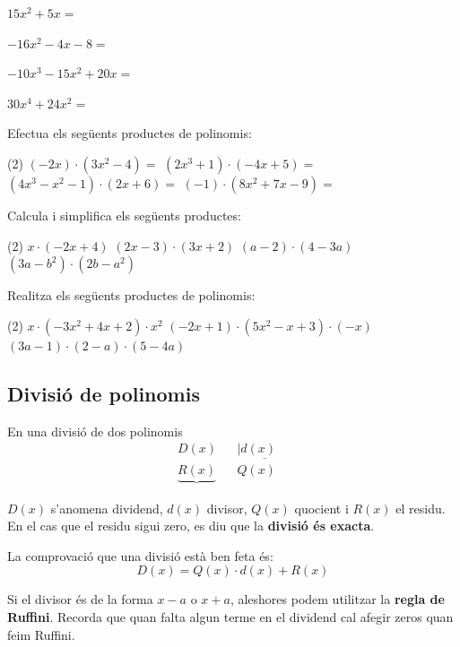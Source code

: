 \begin{mylist}
\begin{tasks}
	\task  $15x^2+5x=$
	   
	\task  $-16x^2-4x-8=$   
	   
	\task  $-10x^{3} -15x^{2} +20x=$   
	
	\task  $30x^{4} +24x^{2}=$
\end{tasks}

\answers{[$2(x^2+x+1)$, $x(x+1)$, $5x(3x+1)$, $-4(4x^2+x+2)$, $-5x(2x^2+3x-4)$, $6x^2(5x^2+6)$]}

\exer  Efectua els següents productes de polinomis:
\begin{tasks}(2)
	\task $(-2x)\cdot (3x^{2} -4)=$
	\task $(2x^{3} +1)\cdot (-4x+5)=$
	\task $(4x^{3} -x^{2} -1)\cdot (2x+6)=$
	\task $(-1)\cdot (8x^{2} +7x-9)=$
\end{tasks}  

 \answers{[$-6x^3+8x$, $-8x^4+10x^3-4x+5$, $8x^4+22x^3-6x^2-2x-6$, $-8x^2-7x+9$]}

\exer  Calcula i simplifica els següents productes: 

\begin{tasks}(2)
	\task   $x\cdot (-2x+4)$     
	\task   $(2x-3)\cdot (3x+2)$    
	\task   $(a-2)\cdot (4-3a)$  
	\task   $(3a-b^{2} )\cdot (2b-a^{2} )$ 
\end{tasks}

\answers{[$-2x^2+4x$, $6x^2-5x-6$, $-3a^2+10a-8$, $-3a^3 + a^2b^2+6ab-2b^3$]}


\exer[1]  Realitza els següents productes de polinomis:

\begin{tasks}(2)
	\task  $x\cdot (-3x^{2} +4x+2)\cdot x^{2} $  
	\task $(-2x+1)\cdot (5x^{2} -x+3)\cdot (-x)$  
	\task  $(3a-1)\cdot (2-a)\cdot (5-4a)$
\end{tasks}
\answers[cols=1]{[$-3x^5+4x^4+2x^3$, $10x^4-8x^3+7x^2-3x$, $12\,a^3-43\,a^2+43\,a-10$]}

\end{mylist}

\subsection{Divisió de polinomis}

\begin{theorybox}
En una divisió de dos polinomis
\[ 
	\begin{array}{lll}
	D(x) & & |\underline{d(x)\quad} \\
	\underbrace{R(x)} & & Q(x)
	\end{array}
\]

$D(x)$ s'anomena dividend, $d(x)$ divisor, $Q(x)$ quocient i $R(x)$ el residu. En el cas que el residu sigui zero, es diu que la \textbf{divisió és exacta}.

La comprovació que una divisió està ben feta és:
\[ \boxed{ D(x)= Q(x)\cdot d(x) + R(x)}  \]

Si el divisor és de la forma $x-a$ o $x+a$, aleshores podem utilitzar la \textbf{regla de Ruffini}. Recorda que quan falta algun terme en el dividend cal afegir zeros quan feim Ruffini.
   

   
\end{theorybox}

